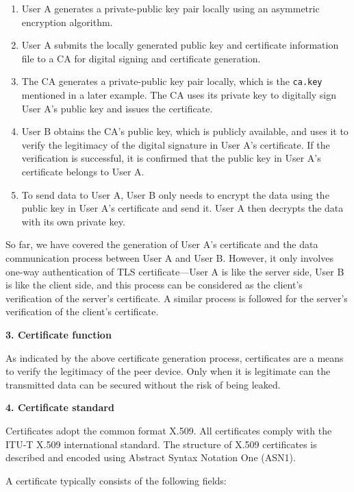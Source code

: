 \documentclass[a4paper,12pt]{book}
\begin{document}
\begin{enumerate}[label=(\arabic*)]
    \item User A generates a private-public key pair locally using an asymmetric encryption algorithm.
    \item User A submits the locally generated public key and certificate information file to a CA for digital signing and certificate generation. 
    \item The CA generates a private-public key pair locally, which is the \verb|ca.key| mentioned in a later example. The CA uses its private key to digitally sign User A’s public key and issues the certificate.
    \item User B obtains the CA’s public key, which is publicly available, and uses it to verify the legitimacy of the digital signature in User A’s certificate. If the verification is successful, it is confirmed that the public key in User A’s certificate belongs to User A.
    \item To send data to User A, User B only needs to encrypt the data using the public key in User A’s certificate and send it. User A then decrypts the data with its own private key.
\end{enumerate}

So far, we have covered the generation of User A’s certificate and the data communication process between User A and User B. However, it only involves one-way authentication of TLS certificate—User A is like the server side, User B is like the client side, and this process can be considered as the client’s verification of the server’s certificate. A similar process is followed for the server’s verification of the client’s certificate.

\textbf{3.	Certificate function}

As indicated by the above certificate generation process, certificates are a means to verify the legitimacy of the peer device. Only when it is legitimate can the transmitted data can be secured without the risk of being leaked.

\textbf{4.	Certificate standard}

Certificates adopt the common format X.509. All certificates comply with the ITU-T X.509 international standard. The structure of X.509 certificates is described and encoded using Abstract Syntax Notation One (ASN1). 

A certificate typically consists of the following fields:
\end{document}
